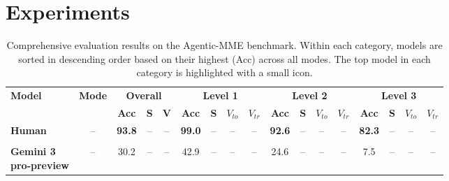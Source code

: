 \documentclass[runningheads]{llncs}
\theoremstyle{plain}
\theoremstyle{definition}
\theoremstyle{remark}
\begin{document}
\section{Experiments}
\label{sec:exp}
\vspace{-2mm}

\begin{table}[!t]
\centering
\caption{Comprehensive evaluation results on the Agentic-MME benchmark. Within each category, models are sorted in descending order based on their highest (Acc) across all modes. The top model in each category is highlighted with a small icon.}
\vspace{-3mm}
\label{tab:gaia_allmetrics_expanded_v3}
\scriptsize %
\setlength{\tabcolsep}{1.4pt} 
\renewcommand{\arraystretch}{1.1} 


\begin{tabular}{@{} l @{\hspace{2pt}}c | ccc | cccc | cccc | cccc @{}}
\toprule
\multirow{2}{*}{\textbf{Model}} & \multirow{2}{*}{\textbf{Mode}}
& \multicolumn{3}{c|}{\textbf{Overall}}
& \multicolumn{4}{c|}{\textbf{Level 1}}
& \multicolumn{4}{c|}{\textbf{Level 2}}
& \multicolumn{4}{c}{\textbf{Level 3}} \\
\cmidrule(lr){3-5}\cmidrule(lr){6-9}\cmidrule(lr){10-13}\cmidrule(lr){14-17}
& & \textbf{Acc} & \textbf{S} & \textbf{V}
& \textbf{Acc} & \textbf{S} & \textbf{$V_{to}$} & \textbf{$V_{tr}$}
& \textbf{Acc} & \textbf{S} & \textbf{$V_{to}$} & \textbf{$V_{tr}$}
& \textbf{Acc} & \textbf{S} & \textbf{$V_{to}$} & \textbf{$V_{tr}$} \\
\midrule
\textbf{Human} & -- 
& \textbf{93.8} & -- & -- & \textbf{99.0} & -- & -- & -- & \textbf{92.6} & -- & -- & -- & \textbf{82.3} & -- & -- & -- \\

\midrule
\multicolumn{17}{l}{\cellcolor{colorNoTool}{\textit{No Tooluse Models }}} \\
\Xhline{0.5pt}
\makecell[l]{\textbf{Gemini 3}\\\textbf{pro-preview}} & --
& 30.2 & -- & -- & 42.9 & -- & -- & -- & 24.6 & -- & -- & -- & 7.5 & -- & -- & -- \\


\end{tabular}
\end{table}
\end{document}
